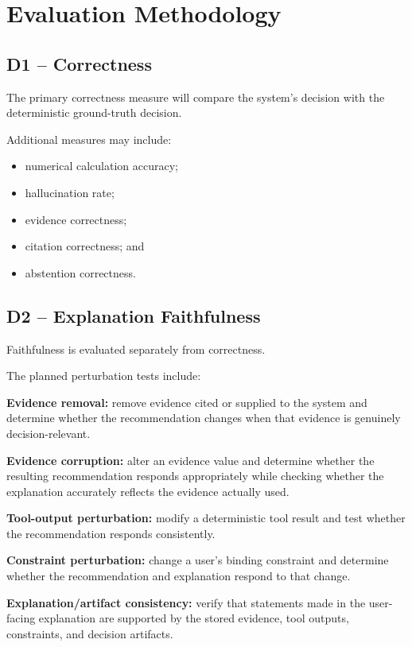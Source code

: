 \documentclass[12pt,a4paper]{article}
\begin{document}
\section{Evaluation Methodology}

\subsection{D1 -- Correctness}

The primary correctness measure will compare the system's decision with the deterministic ground-truth decision.

Additional measures may include:
\begin{itemize}
    \item numerical calculation accuracy;
    \item hallucination rate;
    \item evidence correctness;
    \item citation correctness; and
    \item abstention correctness.
\end{itemize}

\subsection{D2 -- Explanation Faithfulness}

Faithfulness is evaluated separately from correctness.

The planned perturbation tests include:

\textbf{Evidence removal:} remove evidence cited or supplied to the system and determine whether the recommendation changes when that evidence is genuinely decision-relevant.

\textbf{Evidence corruption:} alter an evidence value and determine whether the resulting recommendation responds appropriately while checking whether the explanation accurately reflects the evidence actually used.

\textbf{Tool-output perturbation:} modify a deterministic tool result and test whether the recommendation responds consistently.

\textbf{Constraint perturbation:} change a user's binding constraint and determine whether the recommendation and explanation respond to that change.

\textbf{Explanation/artifact consistency:} verify that statements made in the user-facing explanation are supported by the stored evidence, tool outputs, constraints, and decision artifacts.
\end{document}
